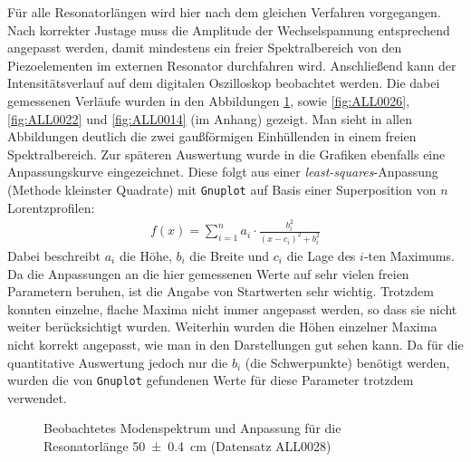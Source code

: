 \documentclass[11pt, a4paper]{article}
\numberwithin{equation}{section}
\begin{document}
Für alle Resonatorlängen wird hier nach dem gleichen Verfahren vorgegangen.
Nach korrekter Justage muss die Amplitude der Wechselspannung entsprechend angepasst werden, damit mindestens ein freier Spektralbereich von den Piezoelementen im externen Resonator durchfahren wird.
Anschließend kann der Intensitätsverlauf auf dem digitalen Oszilloskop beobachtet werden.
Die dabei gemessenen Verläufe wurden in den Abbildungen \ref{fig:ALL0028}, sowie \ref{fig:ALL0026}, \ref{fig:ALL0022} und \ref{fig:ALL0014} (im Anhang) gezeigt. 
Man sieht in allen Abbildungen deutlich die zwei gaußförmigen Einhüllenden in einem freien Spektralbereich.
Zur späteren Auswertung wurde in die Grafiken ebenfalls eine Anpassungskurve eingezeichnet.
Diese folgt aus einer \emph{least-squares}-Anpassung (Methode kleinster Quadrate) mit \texttt{Gnuplot} auf Basis einer Superposition von $n$ Lorentzprofilen:
\begin{align}
f(x)=\sum_{i=1}^{n}a_i\cdot\frac{b_i^2}{(x-c_i)^2+b_i^2}
\end{align}
Dabei beschreibt $a_i$ die Höhe, $b_i$ die Breite und $c_i$ die Lage des $i$-ten Maximums.
Da die Anpassungen an die hier gemessenen Werte auf sehr vielen freien Parametern beruhen, ist die Angabe von Startwerten sehr wichtig.
Trotzdem konnten einzelne, flache Maxima nicht immer angepasst werden, so dass sie nicht weiter berücksichtigt wurden.
Weiterhin wurden die Höhen einzelner Maxima nicht korrekt angepasst, wie man in den Darstellungen gut sehen kann.
Da für die quantitative Auswertung jedoch nur die $b_i$ (die Schwerpunkte) benötigt werden, wurden die von \texttt{Gnuplot} gefundenen Werte für diese Parameter trotzdem verwendet.
\begin{figure}[htb]
\centering

\caption{Beobachtetes Modenspektrum und Anpassung für die Resonatorlänge \SI{50+-0.4}{\centi\meter} (Datensatz ALL0028)}
\label{fig:ALL0028}
\end{figure}
\end{document}
